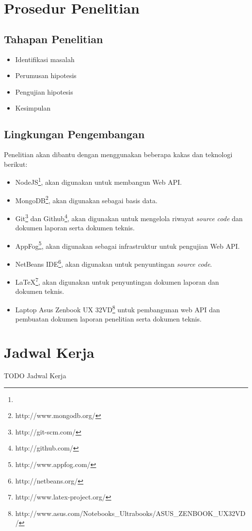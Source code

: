 \documentclass[a4paper, 12pt]{report}
\begin{document}
\section*{Prosedur Penelitian}

\subsection*{Tahapan Penelitian}

\begin{itemize}
  \item Identifikasi masalah
  \item Perumusan hipotesis
  \item Pengujian hipotesis
  \item Kesimpulan
\end{itemize}

\subsection*{Lingkungan Pengembangan}
Penelitian akan dibantu dengan menggunakan beberapa kakas dan teknologi berikut:
\begin{itemize}
  \item NodeJS\footnote{}, akan digunakan untuk membangun Web API.
  \item MongoDB\footnote{http://www.mongodb.org/}, akan digunakan sebagai basis data.
  \item Git\footnote{http://git-scm.com/} dan Github\footnote{http://github.com/}, akan digunakan untuk mengelola riwayat \textit{source code} dan dokumen laporan serta dokumen teknis.
  \item AppFog\footnote{http://www.appfog.com/}, akan digunakan sebagai infrastruktur untuk pengujian Web API.
  \item NetBeans IDE\footnote{http://netbeans.org/}, akan digunakan untuk penyuntingan \textit{source code}.
  \item LaTeX\footnote{http://www.latex-project.org/}, akan digunakan untuk penyuntingan dokumen laporan dan dokumen teknis.
  \item Laptop Asus Zenbook UX 32VD\footnote{http://www.asus.com/Notebooks\_Ultrabooks/ASUS\_ZENBOOK\_UX32VD/} untuk pembangunan web API dan pembuatan dokumen laporan penelitian serta dokumen teknis.
\end{itemize}

\section*{Jadwal Kerja}
\onehalfspacing 
\begin{flushleft}
TODO Jadwal Kerja
\end{flushleft}
\end{document}

